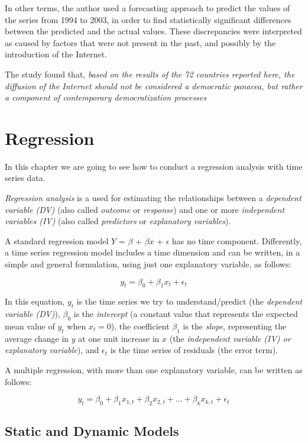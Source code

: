 \documentclass[
]{article}
\begin{document}
In other terms, the author used a forecasting approach to predict the values of the series from 1994 to 2003, in order to find statistically significant differences between the predicted and the actual values. These discrepancies were interpreted as caused by factors that were not present in the past, and possibly by the introduction of the Internet.

The study found that, \emph{based on the results of the 72 countries reported here, the diffusion of the Internet should not be considered a democratic panacea, but rather a component of contemporary democratization processes}

\hypertarget{regression}{%
\section{Regression}\label{regression}}

In this chapter we are going to see how to conduct a regression analysis with time series data.

\emph{Regression analysis} is a used for estimating the relationships between a \emph{dependent variable (DV)} (also called \emph{outcome} or \emph{response}) and one or more \emph{independent variables (IV)} (also called \emph{predictors} or \emph{explanatory variables}).

A standard regression model \(Y\) = \(\beta\) + \(\beta x\) + \(\epsilon\) has no time component. Differently, a time series regression model includes a time dimension and can be written, in a simple and general formulation, using just one explanatory variable, as follows:

\[
y_t = \beta_0 + \beta_1x_t + \epsilon_t
\]

In this equation, \(y_t\) is the time series we try to understand/predict (the \emph{dependent variable (DV)}), \(\beta_0\) is the \emph{intercept} (a constant value that represents the expected mean value of \(y_t\) when \(x_t = 0\)), the coefficient \(\beta_1\) is the \emph{slope}, representing the average change in \(y\) at one unit increase in \(x\) (the \emph{independent variable (IV) or explanatory variable}), and \(\epsilon_t\) is the time series of residuals (the error term).

A multiple regression, with more than one explanatory variable, can be written as follows:

\[
y_t = \beta_0 + \beta_1x_{1,t} + \beta_2x_{2,t} + ... + \beta_kx_{k,t} + \epsilon_t
\]

\hypertarget{static-and-dynamic-models}{%
\subsection{Static and Dynamic Models}\label{static-and-dynamic-models}}
\end{document}
